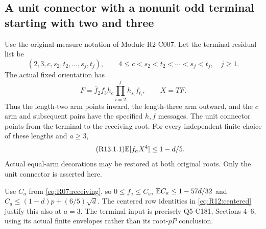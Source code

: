 \subsection{A unit connector with a nonunit odd terminal starting with two and three}\label{proof:R2-C013}
Use the original-measure notation of Module R2-C007. Let the terminal
residual list be
\[
(2,3,c,s_2,t_2,\ldots,s_j,t_j),\qquad
4\le c<s_2<t_2<\cdots<s_j<t_j,\quad j\ge1.
\]
The actual fixed orientation has
\[
F=\bar f_2f_3h_c\prod_{i=2}^jh_{s_i}f_{t_i},\qquad X=TF.
\]
Thus the length-two arm points inward, the length-three arm outward,
and the $c$ arm and subsequent pairs have the specified $h,f$ messages.
The unit connector points from the terminal to the receiving root.
For every independent finite choice of these lengths and $a\ge3$,
\begin{equation}\tag{R13.1.1}\label{eq:R13:claim}
 \mathbb E[f_aX^4]\le1-d/5.
\end{equation}
Actual equal-arm decorations may be restored at both original roots.
Only the unit connector is asserted here.

Use $C_a$ from \eqref{eq:R07:receiving}, so
$0\le f_a\le C_a$, $\mathbb E C_a\le1-57d/32$ and
$C_a\le(1-d)p+(6/5)\sqrt d$.
The centered row identities in \eqref{eq:R12:centered} justify this
also at $a=3$. The terminal input is precisely Q5-C181, Sections 4--6,
using its actual finite envelopes rather than its root-$pP$ conclusion.

